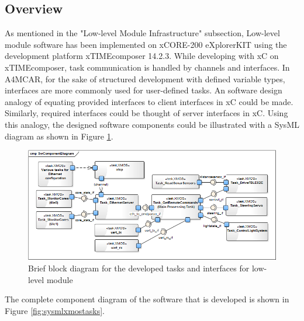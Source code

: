 \subsection{Overview}
As mentioned in the "Low-level Module Infrastructure" subsection, Low-level module software has been implemented on xCORE-200 eXplorerKIT using the development platform xTIMEcomposer 14.2.3. While developing with xC on xTIMEcomposer, task communication is handled by channels and interfaces. In A4MCAR, for the sake of structured development with defined variable types, interfaces are more commonly used for user-defined tasks. An software design analogy of equating provided interfaces to client interfaces in xC could be made. Similarly, required interfaces could be thought of server interfaces in xC. Using this analogy, the designed software components could be illustrated with a SysML \cite{sysml} diagram as shown in Figure \ref{fig:sysmlxmostasksbrief}.
\begin{figure}[!ht]
	\includegraphics[scale=0.62]{content/images/sysmlxmostasksbrief.png}
	\caption{Brief block diagram for the developed tasks and interfaces for low-level module}
	\label{fig:sysmlxmostasksbrief}
\end{figure}

The complete component diagram of the software that is developed is shown in Figure \ref{fig:sysmlxmostasks}.

